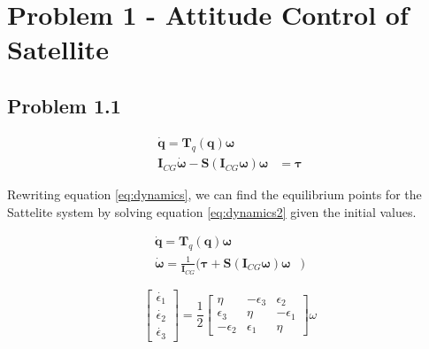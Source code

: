 \section*{Problem 1 - Attitude Control of Satellite}



\subsection*{Problem 1.1} 

\begin{equation}
\label{eq:dynamics}		%
	\begin{aligned}
		\dot{\mathbf{q}} = \mathbf{T}_q (\mathbf{q} ) \boldsymbol{\omega} \\
		\mathbf{I}_{CG} \dot{\boldsymbol{\omega}} - \mathbf{S} (\mathbf{I}_{CG} \boldsymbol{\omega} ) \boldsymbol{\omega} & =  \boldsymbol{\tau}
	\end{aligned}	
\end{equation}

Rewriting equation \ref{eq:dynamics}, we can find the equilibrium points for the Sattelite system by solving equation \ref{eq:dynamics2} given the  initial values. 

\begin{equation}
\label{eq:dynamics2}		%
	\begin{aligned}
		\dot{\mathbf{q}} = \mathbf{T}_q (\mathbf{q} ) \boldsymbol{\omega} \\
		\dot{\boldsymbol{\omega}} =  \frac{1}{\mathbf{I}_{CG}} (\boldsymbol{\tau} + \mathbf{S} (\mathbf{I}_{CG} \boldsymbol{\omega} ) \boldsymbol{\omega} &)
	\end{aligned}	
\end{equation}

\begin{equation}
    \begin{bmatrix}
        \dot{\epsilon_1} \\ \dot{\epsilon_2} \\ \dot{\epsilon_3}
    \end{bmatrix}
    = \frac{1}{2}
      \begin{bmatrix}
        \eta & -\epsilon_3 & \epsilon_2 \\ \epsilon_3 & \eta & - \epsilon_1 \\ -\epsilon_2 & \epsilon_1 & \eta
    \end{bmatrix} 
    \omega
\end{equation}

